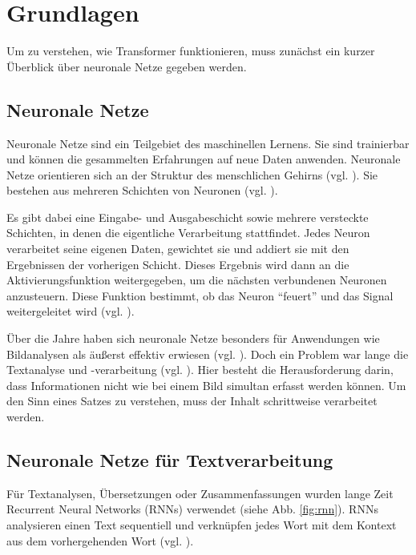 \chapter{Grundlagen}

Um zu verstehen, wie Transformer funktionieren, muss zunächst ein kurzer Überblick über neuronale Netze gegeben werden.  

\section{Neuronale Netze}

Neuronale Netze sind ein Teilgebiet des maschinellen Lernens.
Sie sind trainierbar und können die gesammelten Erfahrungen auf neue Daten anwenden.  
Neuronale Netze orientieren sich an der Struktur des menschlichen Gehirns (vgl. \cite[S. 14]{Kinnebrock.2018}).  
Sie bestehen aus mehreren Schichten von Neuronen (vgl. \cite[S. 25]{Kinnebrock.2018}).  

Es gibt dabei eine Eingabe- und Ausgabeschicht sowie mehrere versteckte Schichten, in denen die eigentliche Verarbeitung stattfindet.  
Jedes Neuron verarbeitet seine eigenen Daten, gewichtet sie und addiert sie mit den Ergebnissen der vorherigen Schicht.  
Dieses Ergebnis wird dann an die Aktivierungsfunktion weitergegeben, um die nächsten verbundenen Neuronen anzusteuern.  
Diese Funktion bestimmt, ob das Neuron \enquote{feuert} und das Signal weitergeleitet wird (vgl. \cite[S. 14]{Kinnebrock.2018}).  

Über die Jahre haben sich neuronale Netze besonders für Anwendungen wie Bildanalysen als äußerst effektiv erwiesen (vgl. \cite[S. 16]{paass.2020}).  
Doch ein Problem war lange die Textanalyse und -verarbeitung (vgl. \cite[S. 22]{paass.2020}).
Hier besteht die Herausforderung darin, dass Informationen nicht wie bei einem Bild simultan erfasst werden können.  
Um den Sinn eines Satzes zu verstehen, muss der Inhalt schrittweise verarbeitet werden.  

\section{Neuronale Netze für Textverarbeitung}

Für Textanalysen, Übersetzungen oder Zusammenfassungen wurden lange Zeit Recurrent Neural Networks (RNNs) verwendet (siehe Abb. \ref{fig:rnn}).  
RNNs analysieren einen Text sequentiell und verknüpfen jedes Wort mit dem Kontext aus dem vorhergehenden Wort (vgl. \cite[S. 2]{attention}).


